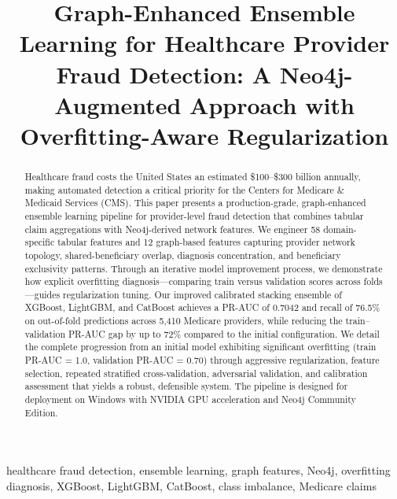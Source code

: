 \documentclass[conference]{IEEEtran}
\begin{document}
\title{Graph-Enhanced Ensemble Learning for Healthcare Provider Fraud Detection: A Neo4j-Augmented Approach with Overfitting-Aware Regularization}

\author{
}

\maketitle

\begin{abstract}
Healthcare fraud costs the United States an estimated \$100--\$300 billion annually, making automated detection a critical priority for the Centers for Medicare \& Medicaid Services (CMS). This paper presents a production-grade, graph-enhanced ensemble learning pipeline for provider-level fraud detection that combines tabular claim aggregations with Neo4j-derived network features. We engineer 58 domain-specific tabular features and 12 graph-based features capturing provider network topology, shared-beneficiary overlap, diagnosis concentration, and beneficiary exclusivity patterns. Through an iterative model improvement process, we demonstrate how explicit overfitting diagnosis---comparing train versus validation scores across folds---guides regularization tuning. Our improved calibrated stacking ensemble of XGBoost, LightGBM, and CatBoost achieves a PR-AUC of 0.7042 and recall of 76.5\% on out-of-fold predictions across 5,410 Medicare providers, while reducing the train--validation PR-AUC gap by up to 72\% compared to the initial configuration. We detail the complete progression from an initial model exhibiting significant overfitting (train PR-AUC = 1.0, validation PR-AUC = 0.70) through aggressive regularization, feature selection, repeated stratified cross-validation, adversarial validation, and calibration assessment that yields a robust, defensible system. The pipeline is designed for deployment on Windows with NVIDIA GPU acceleration and Neo4j Community Edition.
\end{abstract}

\begin{IEEEkeywords}
healthcare fraud detection, ensemble learning, graph features, Neo4j, overfitting diagnosis, XGBoost, LightGBM, CatBoost, class imbalance, Medicare claims
\end{IEEEkeywords}
\end{document}
